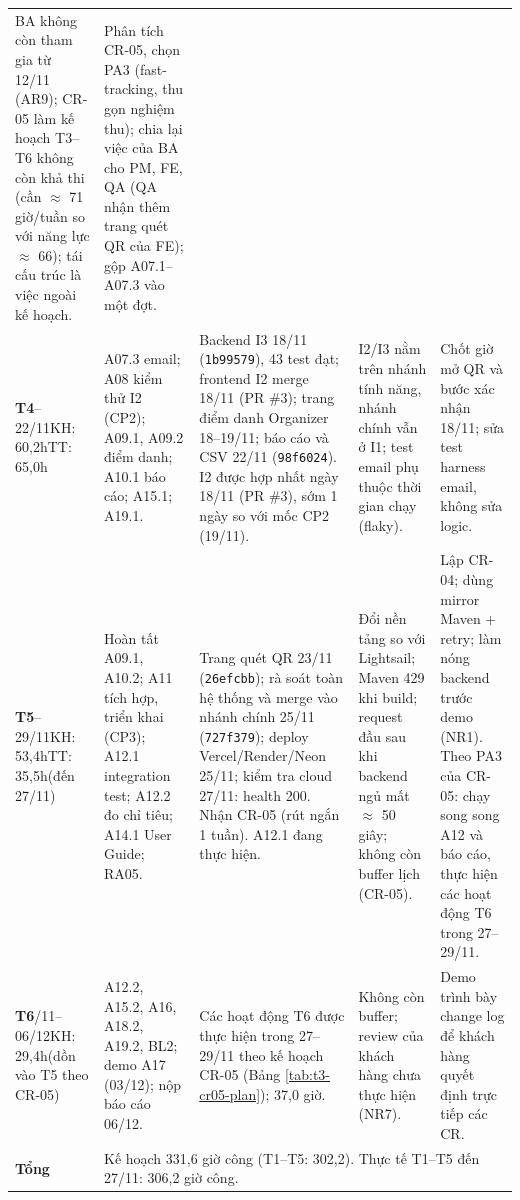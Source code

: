 \begin{longtable}{@{}p{.11\linewidth}p{.20\linewidth}p{.25\linewidth}p{.19\linewidth}p{.19\linewidth}@{}}
BA không còn tham gia từ 12/11 (AR9); CR-05 làm kế hoạch T3--T6 không còn khả thi (cần $\approx$ 71 giờ/tuần so với năng lực $\approx$ 66); tái cấu trúc là việc ngoài kế hoạch. &
Phân tích CR-05, chọn PA3 (fast-tracking, thu gọn nghiệm thu); chia lại việc của BA cho PM, FE, QA (QA nhận thêm trang quét QR của FE); gộp A07.1--A07.3 vào một đợt.\\
\textbf{T4}\newline 16--22/11\newline KH: 60,2h\newline TT: 65,0h &
A07.3 email; A08 kiểm thử I2 (CP2); A09.1, A09.2 điểm danh; A10.1 báo cáo; A15.1; A19.1. &
Backend I3 18/11 (\texttt{1b99579}), 43 test đạt; frontend I2 merge 18/11 (PR \#3); trang điểm danh Organizer 18--19/11; báo cáo và CSV 22/11 (\texttt{98f6024}). I2 được hợp nhất ngày 18/11 (PR \#3), sớm 1 ngày so với mốc CP2 (19/11). &
I2/I3 nằm trên nhánh tính năng, nhánh chính vẫn ở I1; test email phụ thuộc thời gian chạy (flaky). &
Chốt giờ mở QR và bước xác nhận 18/11; sửa test harness email, không sửa logic.\\
\textbf{T5}\newline 23--29/11\newline KH: 53,4h\newline TT: 35,5h\newline (đến 27/11) &
Hoàn tất A09.1, A10.2; A11 tích hợp, triển khai (CP3); A12.1 integration test; A12.2 đo chỉ tiêu; A14.1 User Guide; RA05. &
Trang quét QR 23/11 (\texttt{26efcbb}); rà soát toàn hệ thống và merge vào nhánh chính 25/11 (\texttt{727f379}); deploy Vercel/Render/Neon 25/11; kiểm tra cloud 27/11: health 200. Nhận CR-05 (rút ngắn 1 tuần). A12.1 đang thực hiện. &
Đổi nền tảng so với Lightsail; Maven 429 khi build; request đầu sau khi backend ngủ mất $\approx$ 50 giây; không còn buffer lịch (CR-05). &
Lập CR-04; dùng mirror Maven + retry; làm nóng backend trước demo (NR1). Theo PA3 của CR-05: chạy song song A12 và báo cáo, thực hiện các hoạt động T6 trong 27--29/11.\\
\textbf{T6}\newline 30/11--06/12\newline KH: 29,4h\newline (dồn vào T5 theo CR-05) &
A12.2, A15.2, A16, A18.2, A19.2, BL2; demo A17 (03/12); nộp báo cáo 06/12. &
Các hoạt động T6 được thực hiện trong 27--29/11 theo kế hoạch CR-05 (Bảng \ref{tab:t3-cr05-plan}); 37,0 giờ. &
Không còn buffer; review của khách hàng chưa thực hiện (NR7). &
Demo trình bày change log để khách hàng quyết định trực tiếp các CR.\\
\midrule
\textbf{Tổng} & \multicolumn{4}{l}{Kế hoạch 331,6 giờ công (T1--T5: 302,2). Thực tế T1--T5 đến 27/11: 306,2 giờ công.}\\
\end{longtable}
\endgroup


